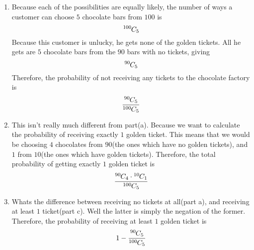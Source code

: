 \documentclass[11pt]{article}
\newcommand*{\permcomb}[4][0mu]{{{}^{#3}\mkern#1#2_{#4}}}
\newcommand*{\comb}[1][-1mu]{\permcomb[#1]{C}}
\begin{document}
\begin{enumerate}
			\begin{enumerate}
				\item Because each of the possibilities are equally likely, the number of ways a customer can choose $5$ chocolate bars from $100$ is $$ \comb{100}{5}  $$
				Because this customer is unlucky, he gets none of the golden tickets. All he gets are $5$ chocolate bars from the $90$ bars with no tickets, giving $$ \comb{90}{5} $$
				Therefore, the probability of not receiving any tickets to the chocolate factory is 
				$$ \frac{\comb{90}{5}}{\comb{100}{5}}$$
				
				\item This isn't really much different from part(a). Because we want to calculate the probability of receiving exactly $1$ golden ticket. This means that we would be choosing $4$ chocolates from $90$(the ones which have no golden tickets), and $1$ from $10$(the ones which have golden tickets). Therefore, the total probability of getting exactly $1$ golden ticket is 
				$$ \frac{\comb{90}{4} \cdot \comb{10}{1}}{\comb{100}{5}}$$
				
				\item Whats the difference between receiving no tickets at all(part a), and receiving at least $1$ ticket(part c). Well the latter is simply the negation of the former. Therefore, the probability of receiving at least $1$ golden ticket is 
				$$ 1 - \frac{\comb{90}{5}}{\comb{100}{5}}$$
			\end{enumerate}
		
		
		

\end{enumerate}
\end{document}
